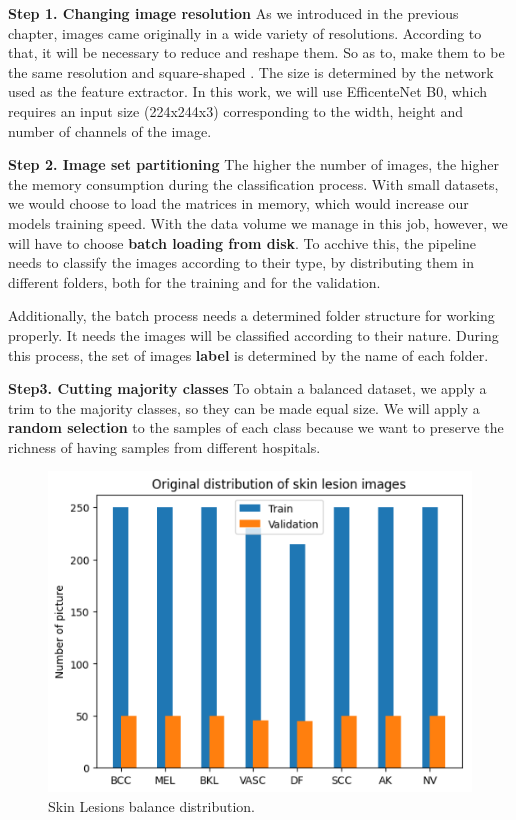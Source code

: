 \textbf{Step 1. Changing image resolution}
As we introduced in the previous chapter, images came originally in a wide variety of resolutions. According to that, it will be necessary to reduce and reshape them. So as to, make them to be the same resolution and square-shaped . The size is determined by the network used as the feature extractor. In this work, we will use EfficenteNet B0, which requires an input size (224x244x3) corresponding to the width, height and number of channels of the image.

\textbf{Step 2. Image set partitioning}
The higher the number of images, the higher the memory consumption during the classification process. With small datasets, we would choose to load the matrices in memory, which would increase  our models training speed. With the data volume we manage in this job, however, we will have to choose \textbf{batch loading from disk}. To acchive this, the pipeline needs to classify the images according to their type, by distributing them in different folders, both for the training and for the validation.

Additionally, the batch process needs a determined folder structure for working properly. It needs the images will be classified according to their nature. During this process, the set of images  \textbf{label}  is determined by the name of each folder.

{\textbf{Step3. Cutting majority classes}}
To obtain a balanced dataset, we apply a trim to the majority classes, so they can be made equal size.  We will apply a \textbf{random selection} to the samples of each class because we want to preserve the richness of having samples from different hospitals.

\begin{figure}[ht]
    \begin{center}
        \includegraphics[scale=0.5]{images/Building/Skin lesion Balance distribution.png}
        \caption{Skin Lesions balance distribution.}
    \label{fig: Skin Lesions balance distribution}    
    \end{center}
\end{figure}

